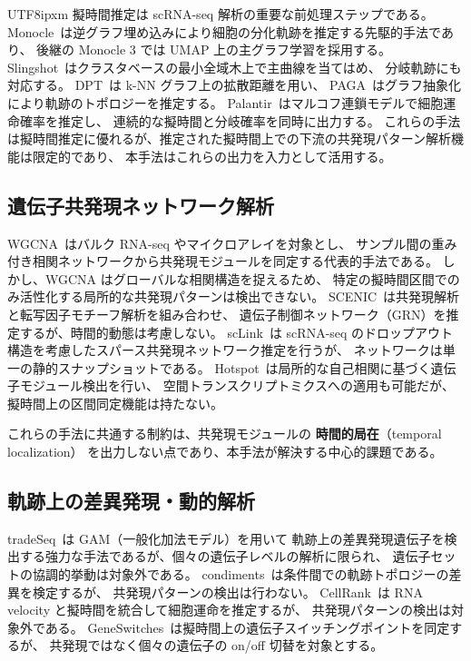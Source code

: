 \documentclass[11pt,a4paper]{article}
\begin{document}
\begin{CJK}{UTF8}{ipxm}
擬時間推定は scRNA-seq 解析の重要な前処理ステップである。
Monocle~\cite{trapnell2014dynamics}は逆グラフ埋め込みにより細胞の分化軌跡を推定する先駆的手法であり、
後継の Monocle 3 では UMAP 上の主グラフ学習を採用する。
Slingshot~\cite{street2018slingshot}はクラスタベースの最小全域木上で主曲線を当てはめ、
分岐軌跡にも対応する。
DPT~\cite{haghverdi2016diffusion}は k-NN グラフ上の拡散距離を用い、
PAGA~\cite{wolf2019paga}はグラフ抽象化により軌跡のトポロジーを推定する。
Palantir~\cite{setty2019palantir}はマルコフ連鎖モデルで細胞運命確率を推定し、
連続的な擬時間と分岐確率を同時に出力する。
これらの手法は擬時間推定に優れるが、推定された擬時間上での下流の共発現パターン解析機能は限定的であり、
本手法はこれらの出力を入力として活用する。

\subsection{遺伝子共発現ネットワーク解析}

WGCNA~\cite{langfelder2008wgcna}はバルク RNA-seq やマイクロアレイを対象とし、
サンプル間の重み付き相関ネットワークから共発現モジュールを同定する代表的手法である。
しかし、WGCNA はグローバルな相関構造を捉えるため、
特定の擬時間区間でのみ活性化する局所的な共発現パターンは検出できない。
SCENIC~\cite{aibar2017scenic}は共発現解析と転写因子モチーフ解析を組み合わせ、
遺伝子制御ネットワーク（GRN）を推定するが、時間的動態は考慮しない。
scLink~\cite{li2021sclink}は scRNA-seq のドロップアウト構造を考慮したスパース共発現ネットワーク推定を行うが、
ネットワークは単一の静的スナップショットである。
Hotspot~\cite{detomaso2021hotspot}は局所的な自己相関に基づく遺伝子モジュール検出を行い、
空間トランスクリプトミクスへの適用も可能だが、擬時間上の区間同定機能は持たない。

これらの手法に共通する制約は、共発現モジュールの \textbf{時間的局在}（temporal localization）
を出力しない点であり、本手法が解決する中心的課題である。

\subsection{軌跡上の差異発現・動的解析}

tradeSeq~\cite{vandenberge2020tradeseq}は GAM（一般化加法モデル）を用いて
軌跡上の差異発現遺伝子を検出する強力な手法であるが、個々の遺伝子レベルの解析に限られ、
遺伝子セットの協調的挙動は対象外である。
condiments~\cite{rouxdebezieux2024condiments}は条件間での軌跡トポロジーの差異を検定するが、
共発現パターンの検出は行わない。
CellRank~\cite{lange2022cellrank}は RNA velocity と擬時間を統合して細胞運命を推定するが、
共発現パターンの検出は対象外である。
GeneSwitches~\cite{cao2020geneswitches}は擬時間上の遺伝子スイッチングポイントを同定するが、
共発現ではなく個々の遺伝子の on/off 切替を対象とする。


\end{CJK}
\end{document}
